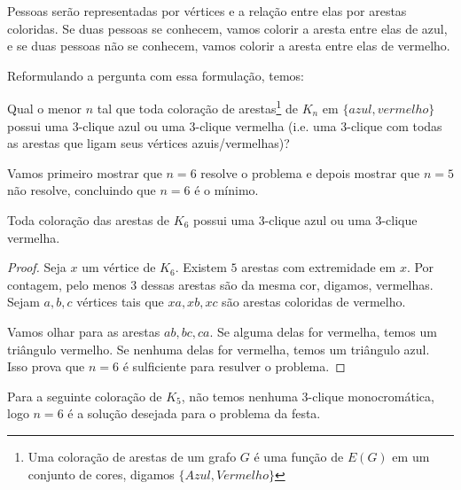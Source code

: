 Pessoas serão representadas por vértices e a relação entre elas por arestas coloridas. Se duas pessoas se conhecem, vamos colorir a aresta entre elas de azul, e se duas pessoas não se conhecem, vamos colorir a aresta entre elas de vermelho.

Reformulando a pergunta com essa formulação, temos:

\begin{problem}
    Qual o menor $n$ tal que toda coloração de arestas\footnote{Uma coloração de arestas de um grafo $G$ é uma função de $E(G)$ em um conjunto de cores, digamos $\{Azul, Vermelho\}$} de $K_n$ em $\{azul, vermelho\}$ possui uma 3-clique azul ou uma 3-clique vermelha (i.e. uma 3-clique com todas as arestas que ligam seus vértices azuis/vermelhas)?
\end{problem}

Vamos primeiro mostrar que $n=6$ resolve o problema e depois mostrar que $n=5$ não resolve, concluindo que $n=6$ é o mínimo.

\begin{prop}
    Toda coloração das arestas de $K_6$ possui uma 3-clique azul ou uma 3-clique vermelha.
\end{prop}
\begin{proof}
    Seja $x$ um vértice de $K_6$. Existem $5$ arestas com extremidade em $x$. Por contagem, pelo menos $3$ dessas arestas são da mesma cor, digamos, vermelhas. Sejam $a,b,c$ vértices tais que $xa,xb,xc$ são arestas coloridas de vermelho.

    Vamos olhar para as arestas $ab,bc,ca$. Se alguma delas for vermelha, temos um triângulo vermelho. Se nenhuma delas for vermelha, temos um triângulo azul. Isso prova que $n=6$ é sulficiente para resulver o problema.
\end{proof}

Para a seguinte coloração de $K_5$, não temos nenhuma 3-clique monocromática, logo $n=6$ é a solução desejada para o problema da festa.
\begin{center}
\end{center}

